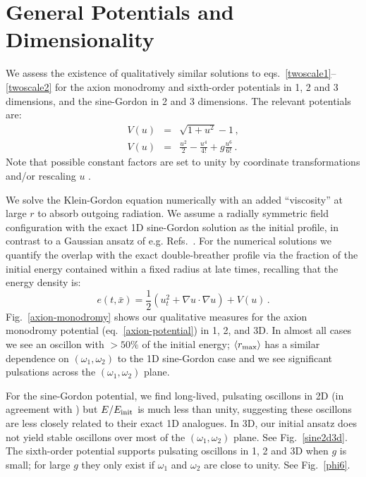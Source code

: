 \documentclass[%
reprint,
superscriptaddress,
amsmath,amssymb,
aps,
prd,
floatfix,
nofootinbib
]{revtex4-1}
\begin{document}
\section{General Potentials and Dimensionality}

We  assess the existence of qualitatively similar solutions to eqs.~\ref{twoscale1}--\ref{twoscale2}  for the axion monodromy  and sixth-order potentials in 1, 2 and 3 dimensions, and the sine-Gordon in 2 and 3 dimensions. The relevant potentials are:
%
\begin{eqnarray}
  V(u) &=& \sqrt{1+u^2}-1 \label{axion-potential} \, ,\\
  V(u) &=& \frac{u^2}{2} - \frac{u^4}{4!} +g \frac{ u^6}{6!} \, .
\end{eqnarray}
%
Note that possible constant factors are set to unity by coordinate transformations and/or rescaling $u$ \cite{Amin:2010dc,Amin:2011hj}.

We solve the Klein-Gordon equation numerically with an added ``viscosity''  at large $r$ to absorb outgoing radiation. We assume a radially symmetric field configuration with the exact 1D sine-Gordon solution as the initial profile, in contrast to  a Gaussian ansatz of e.g. Refs.~\cite{Hindmarsh:2006ur,Gleiser:2008ty,Gleiser:2009ys,Salmi:2012ta}.  For the numerical solutions we quantify the overlap with the exact double-breather profile via the fraction of the initial  energy contained within a fixed radius at late times, recalling that the energy density is:
%
\begin{equation}
  e(t,\bar{x}) = \frac{1}{2}\left(u_t^2+ \nabla u\cdot\nabla u \right) + V(u) \, .
\end{equation}
%
Fig.~\ref{axion-monodromy} shows our qualitative measures for the axion monodromy potential (eq.~\ref{axion-potential}) in 1, 2, and 3D. In almost all cases we see an oscillon with $>50\%$ of the initial energy; $\langle r_{\rm max}\rangle$ has a similar dependence on $(\omega_1,\omega_2)$ to the 1D sine-Gordon case and we see significant pulsations across the $(\omega_1,\omega_2)$ plane.

For the sine-Gordon potential, we find long-lived, pulsating oscillons in 2D (in agreement with  \cite{Hindmarsh:2006ur}) but $E/E_{\rm init}$ is much less than unity, suggesting these oscillons are  less closely related to their exact 1D analogues. In 3D, our initial ansatz does not yield stable oscillons over most of the $(\omega_1,\omega_2)$ plane. See Fig.~\ref{sine2d3d}. The sixth-order potential  supports pulsating oscillons  in 1, 2 and 3D when $g$ is small; for large $g$ they only exist if  $\omega_1$ and $\omega_2$ are close to unity. See Fig.~\ref{phi6}.
\end{document}
